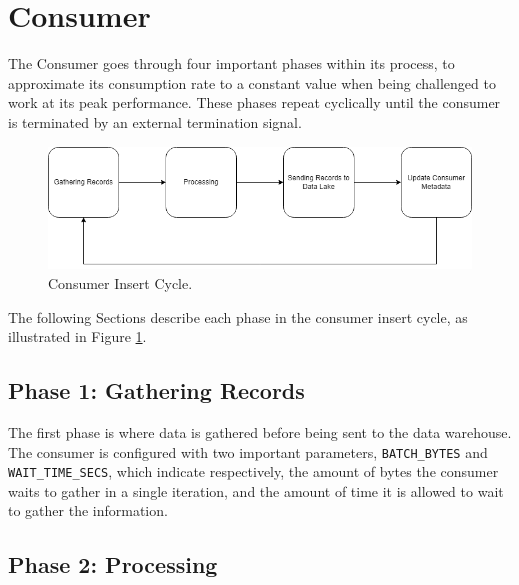 \section{Consumer} \label{component:consumer}

The Consumer goes through four important phases within its process, to
approximate its consumption rate to a constant value when being challenged to
work at its peak performance. These phases repeat cyclically until the consumer
is terminated by an external termination signal. 

\begin{figure}[htb!] 
    \centering
    \includegraphics[width=\textwidth]{images/consumer/consumer_cycle.png}
    \caption{Consumer Insert Cycle.}
    \label{fig:consumer_cycle} 
\end{figure}

The following Sections describe each phase in the consumer insert cycle, as
illustrated in Figure \ref{fig:consumer_cycle}.

\subsection{Phase 1: Gathering Records}

The first phase is where data is gathered before being sent to the data
warehouse. The consumer is configured with two important parameters,
\lstinline[language=Python]{BATCH_BYTES} and
\lstinline[language=Python]{WAIT_TIME_SECS}, which indicate respectively, the
amount of bytes the consumer waits to gather in a single iteration, and the
amount of time it is allowed to wait to gather the information.

\subsection{Phase 2: Processing} \label{consumer:phase2}

